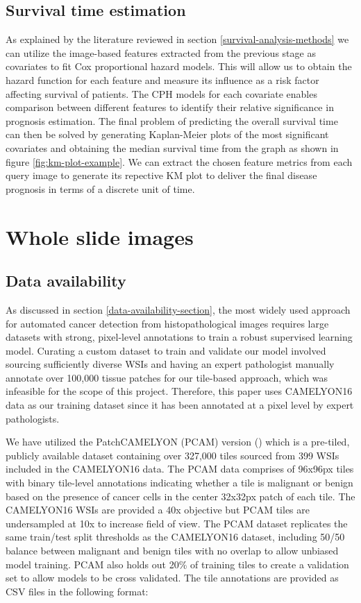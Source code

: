 \documentclass{l4proj}
\begin{document}
\subsection{Survival time estimation}
As explained by the literature reviewed in section \ref{survival-analysis-methods} we can utilize the image-based features extracted from the previous stage as covariates to fit Cox proportional hazard models. This will allow us to obtain the hazard function for each feature and measure its influence as a risk factor affecting survival of patients. The CPH models for each covariate enables comparison between different features to identify their relative significance in prognosis estimation. The final problem of predicting the overall survival time can then be solved by generating Kaplan-Meier plots of the most significant covariates and obtaining the median survival time from the graph as shown in figure \ref{fig:km-plot-example}. We can extract the chosen feature metrics from each query image to generate its repective KM plot to deliver the final disease prognosis in terms of a discrete unit of time. 

\section{Whole slide images}
\subsection{Data availability}
As discussed in section \ref{data-availability-section}, the most widely used approach for automated cancer detection from histopathological images requires large datasets with strong, pixel-level annotations to train a robust supervised learning model. Curating a custom dataset to train and validate our model involved sourcing sufficiently diverse WSIs and having an expert pathologist manually annotate over 100,000 tissue patches for our tile-based approach, which was infeasible for the scope of this project. Therefore, this paper uses CAMELYON16 data as our training dataset since it has been annotated at a pixel level by expert pathologists.

We have utilized the PatchCAMELYON (PCAM) version (\cite{Veeling2018-qh}) which is a pre-tiled, publicly available dataset containing over 327,000 tiles sourced from 399 WSIs included in the CAMELYON16 data. The PCAM data comprises of 96x96px tiles with binary tile-level annotations indicating whether a tile is malignant or benign based on the presence of cancer cells in the center 32x32px patch of each tile. The CAMELYON16 WSIs are provided a 40x objective but PCAM tiles are undersampled at 10x to increase field of view. The PCAM dataset replicates the same train/test split thresholds as the CAMELYON16 dataset, including 50/50 balance between malignant and benign tiles with no overlap to allow unbiased model training. PCAM also holds out 20\% of training tiles to create a validation set to allow models to be cross validated. The tile annotations are provided as CSV files in the following format:
\end{document}
